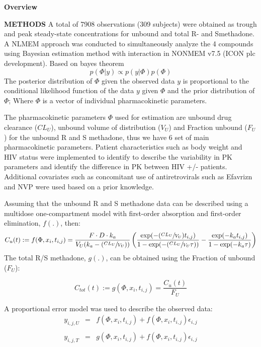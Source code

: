 \documentclass[final]{beamer}
\newlength{\colwidth}
\begin{document}
\begin{frame}[t]
\begin{columns}[t]
\begin{column}{\colwidth}
\begin{block}{\textbf{Overview}}
  \end{block}
  \begin{block}{\textbf{METHODS}} 
 A total of 7908 observations (309 subjects) were obtained as trough and
peak steady-state concentrations for unbound and total R- and Smethadone.
A NLMEM approach was conducted to simultaneously
analyze the 4 compounds using Bayesian estimation method with
interaction in NONMEM v7.5 (ICON plc development). Based on bayes
theorem  \begin{equation}\label{eq:1}
  p(\Phi|y) \propto p(y|\Phi) p(\Phi)
  \end{equation}
  The posterior distribution of $\Phi$ given the observed data $y$ is proportional to the conditional likelihood function of the data $y$ given $\Phi$ and the prior distribution of $\Phi$; Where $\Phi$ is a vector of individual pharmacokinetic parameters. \par
  The pharmacokinetic parameters $\Phi$ used for estimation are unbound drug clearance ($CL_U$), unbound volume of distribution ($V_U$) and Fraction unbound ($F_U$) for the unbound R and S methadone, thus we have 6 set of main pharmacokinetic parameters. Patient characteristics such as body weight and HIV status were implemented to identify to describe the variability in PK parameters and identify the difference in PK between HIV +/- patients. Additional covariates such as concomitant use of antiretrovirals such as Efavrizn and NVP were used based on a prior knowledge.  \par
Assuming that the unbound R and S methadone data can be described using a multidose one-compartment model with first-order absorption and first-order elimination, $f(.)$, then:
\begin{equation}\label{eq:2}
	C_u(t) := f(\Phi, x_i, t_{i,j}) = \frac{F \cdot D \cdot k_a}{V_U(k_a - (\sfrac{CL_U}{V_U}))} \left(\frac{\exp(-(\sfrac{CL_U}{V_U}) t_{i,j})}{1 - \exp(-(\sfrac{CL_U}{V_U}\tau))} - \frac{\exp(-k_a t_{i,j})}{1 - \exp(-k_a\tau)}\right) 
\end{equation}
The total R/S methadone, $g(.)$, can be obtained using the Fraction of unbound ($F_U$):

\begin{equation}\label{eq:3}
	C_{tot}(t) := g(\Phi, x_i, t_{i,j}) = \frac{C_u(t)}{F_U}
\end{equation}

A proportional error model was used to describe the observed data:
\begin{eqnarray*}
	y_{i,j,U} &=& f(\Phi, x_i, t_{i,j}) + f(\Phi, x_i, t_{i,j})\epsilon_{i,j}\\
	~\\
	y_{i,j,T} &=& g(\Phi, x_i, t_{i,j}) + f(\Phi, x_i, t_{i,j})\epsilon_{i,j} 
\end{eqnarray*}


\end{block}
\end{column}
\end{columns}
\end{frame}
\end{document}
